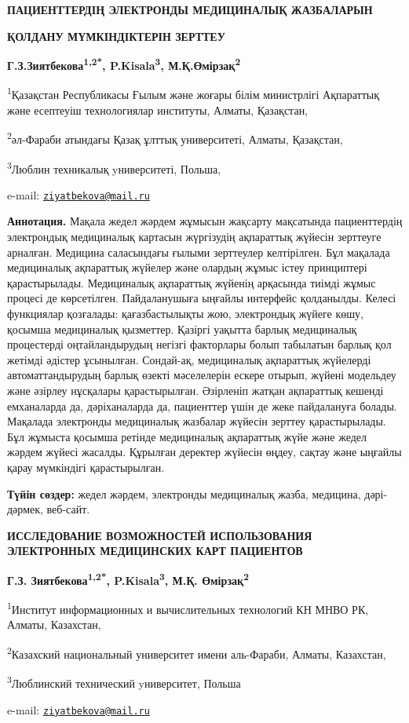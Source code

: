\begin{center}
{\large\bfseries ПАЦИЕНТТЕРДІҢ ЭЛЕКТРОНДЫ МЕДИЦИНАЛЫҚ ЖАЗБАЛАРЫН}

{\bfseries ҚОЛДАНУ МҮМКІНДІКТЕРІН ЗЕРТТЕУ}

{\bfseries Г.З.Зиятбекова\textsuperscript{1,2*},
P.Kisala\textsuperscript{3}, М.Қ.Өмірзақ\textsuperscript{2}}

\textsuperscript{1}Қазақстан Республикасы Ғылым және жоғары білім
министрлігі Ақпараттық және есептеуіш технологиялар институты, Алматы,
Қазақстан,

\textsuperscript{2}әл-Фараби атындағы Қазақ ұлттық университеті, Алматы, Қазақстан,

\textsuperscript{3}Люблин техникалық yниверситеті, Польша,

e-mail:
\href{mailto:ziyatbekova@mail.ru}{\nolinkurl{ziyatbekova@mail.ru}}
\end{center}

{\bfseries Аннотация.} Мақала жедел жәрдем жұмысын жақсарту мақсатында
пациенттердің электрондық медициналық картасын жүргізудің ақпараттық
жүйесін зерттеуге арналған. Медицина саласындағы ғылыми зерттеулер
келтірілген. Бұл мақалада медициналық ақпараттық жүйелер және олардың
жұмыс істеу принциптері қарастырылады. Медициналық ақпараттық жүйенің
арқасында тиімді жұмыс процесі де көрсетілген. Пайдаланушыға ыңғайлы
интерфейс қолданылды. Келесі функциялар қозғалады: қағазбастылықты жою,
электрондық жүйеге көшу, қосымша медициналық қызметтер. Қазіргі уақытта
барлық медициналық процестерді оңтайландырудың негізгі факторлары болып
табылатын барлық қол жетімді әдістер ұсынылған. Сондай-ақ, медициналық
ақпараттық жүйелерді автоматтандырудың барлық өзекті мәселелерін ескере
отырып, жүйені модельдеу және әзірлеу нұсқалары қарастырылған. Әзірленіп
жатқан ақпараттық кешенді емханаларда да, дәріханаларда да, пациенттер
үшін де жеке пайдалануға болады. Мақалада электронды медициналық
жазбалар жүйесін зерттеу қарастырылады. Бұл жұмыста қосымша ретінде
медициналық ақпараттық жүйе және жедел жәрдем жүйесі жасалды. Құрылған
деректер жүйесін өңдеу, сақтау және ыңғайлы қарау мүмкіндігі
қарастырылған.

{\bfseries Түйін сөздер:} жедел жәрдем, электронды медициналық жазба,
медицина, дәрі-дәрмек, веб-сайт.

\begin{center}
{\large\bfseries ИССЛЕДОВАНИЕ ВОЗМОЖНОСТЕЙ ИСПОЛЬЗОВАНИЯ ЭЛЕКТРОННЫХ МЕДИЦИНСКИХ
КАРТ ПАЦИЕНТОВ}

{\bfseries Г.З. Зиятбекова\textsuperscript{1,2*},
P.Kisala\textsuperscript{3}, М.Қ. Өмірзақ\textsuperscript{2}}

\textsuperscript{1}Институт информационных и вычислительных технологий
КН МНВО РК, Алматы, Казахстан,

\textsuperscript{2}Казахский национальный университет имени аль-Фараби,
Алматы, Казахстан,

\textsuperscript{3}Люблинский технический yниверситет, Польша

e-mail:
\href{mailto:ziyatbekova@mail.ru}{\nolinkurl{ziyatbekova@mail.ru}}
\end{center}


